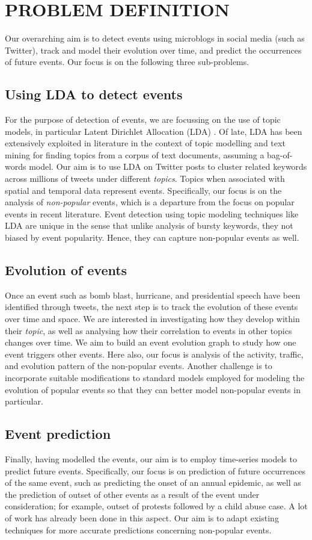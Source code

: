 \section{\uppercase{Problem Definition}}
Our overarching aim is to detect events using microblogs in social media (such as Twitter), track and model their evolution over time, and predict the occurrences of future events. Our focus is on the following three sub-problems.
\subsection{Using LDA to detect events}
For the purpose of detection of events, we are focussing on the use of topic models, in particular Latent Dirichlet Allocation (LDA) \cite{blei2003latent}. Of late, LDA has been extensively exploited in literature in the context of topic modelling and text mining for finding topics from a corpus of text documents, assuming a bag-of-words model. Our aim is to use LDA on Twitter posts to cluster related keywords across millions of tweets under different \emph{topics}. Topics when associated with spatial and temporal data represent events. Specifically, our focus is on the analysis of \emph{non-popular} events, which is a departure from the focus on popular events in recent literature. Event detection using topic modeling techniques like LDA are unique in the sense that unlike analysis of bursty keywords, they not biased by event popularity. Hence, they can capture non-popular events as well.

\subsection{Evolution of events}
Once an event such as bomb blast, hurricane, and presidential speech have been identified through tweets, the next step is to track the evolution of these events over time and space. We are interested in investigating how they develop within their \emph{topic}, as well as analysing how their correlation to events in other topics changes over time. We aim to build an event evolution graph to study how one event triggers other events. Here also, our focus is analysis  of the activity, traffic, and evolution pattern of the non-popular events. Another challenge is to incorporate suitable modifications to standard models employed for modeling the evolution of popular events \cite{lin2010pet} so that they can better model non-popular events in particular.

\subsection{Event prediction}
Finally, having modelled the events, our aim is to employ time-series models to predict future events. Specifically, our focus is on prediction of future occurrences of the same event, such as predicting the onset of an annual epidemic, as well as the prediction of outset of other events as a result of the event under consideration; for example, outset of protests followed by a child abuse case. A lot of work has already been done in this aspect. Our aim is to adapt existing techniques for more accurate predictions concerning non-popular events.